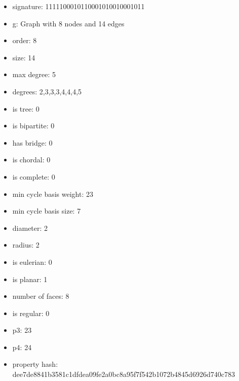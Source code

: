 \begin{itemize}
\item signature: 1111100010110001010010001011
\item g: Graph with 8 nodes and 14 edges
\item order: 8
\item size: 14
\item max degree: 5
\item degrees: 2,3,3,3,4,4,4,5
\item is tree: 0
\item is bipartite: 0
\item has bridge: 0
\item is chordal: 0
\item is complete: 0
\item min cycle basis weight: 23
\item min cycle basis size: 7
\item diameter: 2
\item radius: 2
\item is eulerian: 0
\item is planar: 1
\item number of faces: 8
\item is regular: 0
\item p3: 23
\item p4: 24
\item property hash: dee7de8841b3581c1dfdea09fe2a0bc8a95f7f542b1072b4845d6926d740c783
\end{itemize}
\newpage
\begin{figure}
\end{figure}
